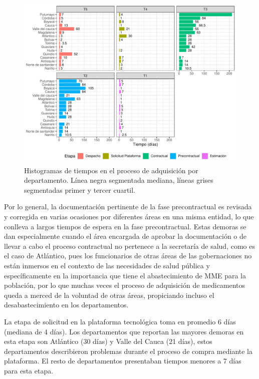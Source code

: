 \documentclass[
]{book}
\begin{document}
\begin{figure}[t]

{\centering \includegraphics[width=0.95\linewidth]{InformeFinal_files/figure-latex/EtapasProcesoAdquisicionDetalle-1} 

}

\caption{Histogramas de tiempos en el proceso de adquisición por departamento. Línea negra segmentada mediana, líneas grises segmentadas primer y tercer cuartil.}\label{fig:EtapasProcesoAdquisicionDetalle}
\end{figure}

Por lo general, la documentación pertinente de la fase precontractual es revisada y corregida en varias ocasiones por diferentes áreas en una misma entidad, lo que conlleva a largos tiempos de espera en la fase precontractual. Estas demoras se dan especialmente cuando el área encargada de aprobar la documentación o de llevar a cabo el proceso contractual no pertenece a la secretaría de salud, como es el caso de Atlántico, pues los funcionarios de otras áreas de las gobernaciones no están inmersos en el contexto de las necesidades de salud pública y específicamente en la importancia que tiene el abastecimiento de MME para la población, por lo que muchas veces el proceso de adquisición de medicamentos queda a merced de la voluntad de otras áreas, propiciando incluso el desabastecimiento en los departamentos.

La etapa de solicitud en la plataforma tecnológica toma en promedio 6 días (mediana de 4 días). Los departamentos que reportan las mayores demoras en esta etapa son Atlántico (30 días) y Valle del Cauca (21 días), estos departamentos describieron problemas durante el proceso de compra mediante la plataforma. El resto de departamentos presentaban tiempos menores a 7 días para esta etapa.
\end{document}
